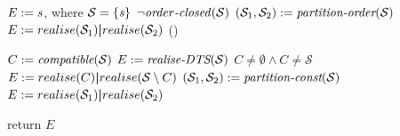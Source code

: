 \begin{function}[!t]
\SetNoFillComment
{}
   {
      $E:=\mathit{s}$, where $\mathcal{S}=\{\mathit{s}\}$
   }
   \ElseIf%
       {$\neg\mathit{order}\emph{-}\mathit{closed}(\mathcal{S})$}{
     $(\mathcal{S}_1,\mathcal{S}_2):= \emph{partition-order}(\mathcal{S})$\;
                   $E:=realise(\mathcal{S}_1)\boldsymbol{|} realise(\mathcal{S}_2)$\;
                         }
            \Else()
                {
                  $C:=\emph{compatible}(\mathcal{S})$
                 {
                   $E:=\emph{realise-DTS}(\mathcal{S})$
                 }
                 \Else
                 {
                   \If%
                      {$C\neq\emptyset \wedge C\neq\mathcal{S}$}
                      {
                        $E:=realise(C)\boldsymbol{|} realise(\mathcal{S}\setminus C)$\;
                 }
                 \Else
                     {
                     $(\mathcal{S}_1,\mathcal{S}_2):=\emph{partition-const}(\mathcal{S})$\;
                     $E:=realise(\mathcal{S}_1)\boldsymbol{|} realise(\mathcal{S}_2)$\;
                     }
                     }

                  }
return $E$\;
	\caption{realise(a set of scenarios $\mathcal{S}$)}
        \label{algo-realise}
\end{function}

